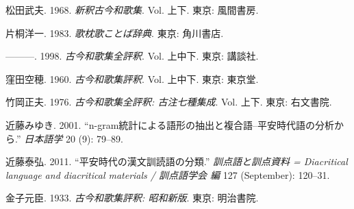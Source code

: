 \documentclass[
  letterpaper,
  DIV=11,
  numbers=noendperiod]{scrartcl}
\newlength{\cslhangindent}
\newenvironment{CSLReferences}[2] %
 {\begin{list}{}{%
  \setlength{\itemindent}{0pt}
  \setlength{\leftmargin}{0pt}
  \setlength{\parsep}{0pt}
  \ifodd #1
   \setlength{\leftmargin}{\cslhangindent}
   \setlength{\itemindent}{-1\cslhangindent}
  \fi
  \setlength{\itemsep}{#2\baselineskip}}}
 {\end{list}}
\begin{document}
\begin{CSLReferences}{1}{0}
松田武夫. 1968. \emph{新釈古今和歌集}. Vol. 上下. 東京: 風間書房.

片桐洋一. 1983. \emph{歌枕歌ことば辞典}. 東京: 角川書店.

---------. 1998. \emph{{古今和歌集全評釈}}. Vol. 上中下. 東京: 講談社.

窪田空穂. 1960. \emph{古今和歌集評釈}. Vol. 上中下. 東京: 東京堂.

竹岡正夫. 1976. \emph{{古今和歌集全評釈: 古注七種集成}}. Vol. 上下.
東京: 右文書院.

近藤みゆき. 2001.
{``{n-gram統計による語形の抽出と複合語--平安時代語の分析から}.''}
\emph{日本語学} 20 (9): 79--89.

近藤泰弘. 2011. {``{平安時代の漢文訓読語の分類}.''}
\emph{訓点語と訓点資料 = Diacritical language and diacritical materials
/ 訓点語学会 編} 127 (September): 120--31.

金子元臣. 1933. \emph{古今和歌集評釈: 昭和新版}. 東京: 明治書院.

\end{CSLReferences}
\end{document}
